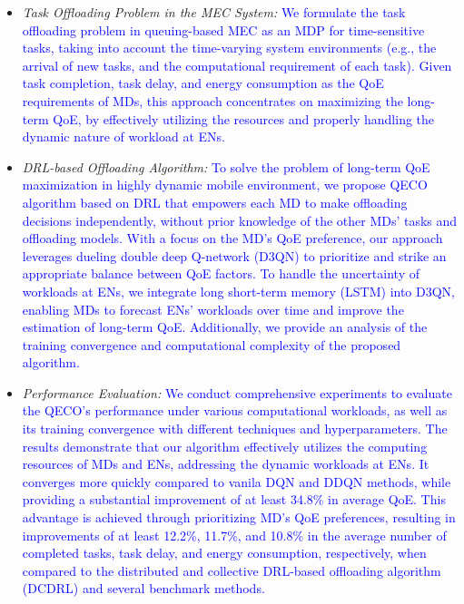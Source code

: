 \documentclass[12pt,draftclsnofoot,onecolumn]{IEEEtran}
\begin{document}
\begin{itemize}
	\item \textit{Task Offloading Problem in the MEC System:} \textcolor{blue}{ We formulate the task offloading problem in queuing-based MEC as an MDP for time-sensitive tasks, taking into account the time-varying system environments (e.g., the arrival of new tasks, and the computational requirement of each task). Given task completion, task delay, and energy consumption as the QoE requirements of MDs, this approach concentrates on maximizing the long-term QoE, by effectively utilizing the resources and properly handling the dynamic nature of workload at ENs.}
	
	
	\item \textit{DRL-based Offloading Algorithm:} \textcolor{blue}{To solve the problem of long-term QoE maximization in highly dynamic mobile environment, we propose QECO algorithm based on DRL that empowers each MD to make offloading decisions independently, without prior knowledge of the other MDs' tasks and offloading models. 		
		With a focus on the MD's QoE preference, our approach leverages dueling double deep Q-network (D3QN) \cite{wang2016dueling} to prioritize and strike an appropriate balance between QoE factors. 
		To handle the uncertainty of workloads at ENs, we integrate long short-term memory (LSTM) \cite{hochreiter1997long} into D3QN, enabling MDs to forecast ENs' workloads over time and improve the estimation of long-term QoE. Additionally, we provide an analysis of the training convergence and computational complexity of the proposed algorithm.}
	
	
	\item \textit{Performance Evaluation:} \textcolor{blue}{We conduct comprehensive experiments to evaluate the QECO's performance under various computational workloads, as well as its training convergence with different techniques and hyperparameters. The results demonstrate that our algorithm effectively utilizes the computing resources of MDs and ENs, addressing the dynamic workloads at ENs. It converges more quickly compared to vanila DQN and DDQN methods, while providing a substantial improvement of at least 34.8\% in average QoE. This advantage is achieved through prioritizing MD's QoE preferences, resulting in improvements of at least 12.2\%, 11.7\%, and 10.8\% in the average number of completed tasks, task delay, and energy consumption, respectively, when compared to the distributed and collective DRL-based offloading algorithm (DCDRL) \cite{qiu2020distributed} and several benchmark methods.}
	
	
	
\end{itemize}
\end{document}
